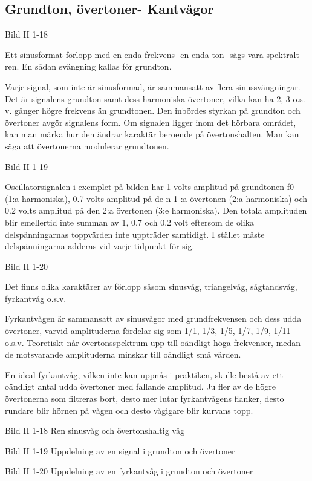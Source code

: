 \documentclass[a4paper,twoside,twocolumn,openright]{book}
\begin{document}
\subsection{Grundton, övertoner- Kantvågor}

Bild II 1-18

Ett sinusformat förlopp med en enda frekvens- en enda ton- sägs vara spektralt ren.
En sådan svängning kallas för grundton.

Varje signal, som inte är sinusformad, är sammansatt av flera sinussvängningar. Det är
signalens grundton samt dess harmoniska övertoner, vilka kan ha 2, 3 o.s. v. gånger högre
frekvens än grundtonen. Den inbördes styrkan på grundton och övertoner avgör signalens
form. Om signalen ligger inom det hörbara området, kan man märka hur den ändrar karaktär
beroende på övertonshalten. Man kan säga att övertonerna modulerar grundtonen.

Bild II 1-19

Oscillatorsignalen i exemplet på bilden har 1 volts amplitud på grundtonen f0 (1:a
harmoniska), 0.7 volts amplitud på de n 1 :a övertonen (2:a harmoniska) och 0.2 volts
amplitud på den 2:a övertonen (3:e harmoniska). Den totala amplituden blir emellertid inte
summan av 1, 0.7 och 0.2 volt eftersom de olika delspänningarnas toppvärden inte uppträder
samtidigt. I stället måste delspänningarna adderas vid varje tidpunkt för sig.

Bild II 1-20

Det finns olika karaktärer av förlopp såsom sinusvåg, triangelvåg, sågtandsvåg,
fyrkantvåg o.s.v.

Fyrkantvågen är sammansatt av sinusvågor med grundfrekvensen och dess udda övertoner,
varvid amplituderna fördelar sig som 1/1, 1/3, 1/5, 1/7, 1/9, 1/11 o.s.v. Teoretiskt når
övertonsspektrum upp till oändligt höga frekvenser, medan de motsvarande amplituderna
minskar till oändligt små värden.

En ideal fyrkantvåg, vilken inte kan uppnås i praktiken, skulle bestå av ett oändligt
antal udda övertoner med fallande amplitud. Ju fler av de högre övertonerna som filtreras
bort, desto mer lutar fyrkantvågens flanker, desto rundare blir hörnen på vågen och
desto vågigare blir kurvans topp.

Bild II 1-18 Ren sinusvåg och övertonshaltig våg

Bild II 1-19 Uppdelning av en signal i grundton och övertoner

Bild II 1-20 Uppdelning av en fyrkantvåg i grundton och övertoner
\end{document}
